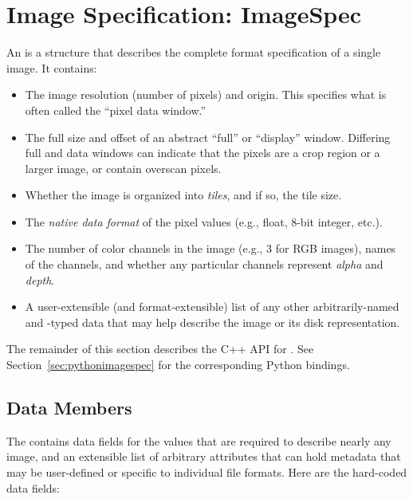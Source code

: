 \newpage

\section{Image Specification: {\cf ImageSpec}}
\label{sec:ImageSpec}

An \ImageSpec is a structure that describes the complete
format specification of a single image.  It contains:

\begin{itemize}
\item The image resolution (number of pixels) and origin. This specifies
  what is often called the ``pixel data window.''
\item The full size and offset of an abstract ``full'' or ``display''
  window. Differing full and data windows can indicate that the pixels
  are a crop region or a larger image, or contain overscan pixels.
\item Whether the image is organized into \emph{tiles}, and if so, the
  tile size.
\item The \emph{native data format} of the pixel values (e.g., float, 8-bit
  integer, etc.).
\item The number of color channels in the image (e.g., 3 for RGB
  images), names of the channels, and whether any particular channels
  represent \emph{alpha} and \emph{depth}.
\item A user-extensible (and format-extensible) list of any other
  arbitrarily-named and -typed data that may help describe the image or
  its disk representation.
\end{itemize}

The remainder of this section describes the C++ API for \ImageSpec.
See Section~\ref{sec:pythonimagespec} for the corresponding Python
bindings.

\subsection{\ImageSpec Data Members}

The \ImageSpec contains data fields for the values that are
required to describe nearly any image, and an extensible list of
arbitrary attributes that can hold metadata that may be user-defined or
specific to individual file formats.  Here are the hard-coded data
fields:


